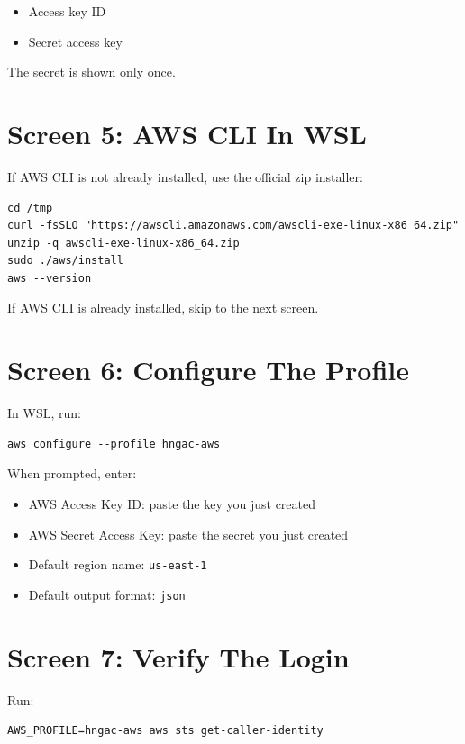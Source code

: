 \documentclass[11pt]{article}
\begin{document}
\begin{itemize}
\item Access key ID
\item Secret access key
\end{itemize}

The secret is shown only once.

\section*{Screen 5: AWS CLI In WSL}

If AWS CLI is not already installed, use the official zip installer:

\begin{verbatim}
cd /tmp
curl -fsSLO "https://awscli.amazonaws.com/awscli-exe-linux-x86_64.zip"
unzip -q awscli-exe-linux-x86_64.zip
sudo ./aws/install
aws --version
\end{verbatim}

If AWS CLI is already installed, skip to the next screen.

\section*{Screen 6: Configure The Profile}

In WSL, run:

\begin{verbatim}
aws configure --profile hngac-aws
\end{verbatim}

When prompted, enter:

\begin{itemize}
\item AWS Access Key ID: paste the key you just created
\item AWS Secret Access Key: paste the secret you just created
\item Default region name: \texttt{us-east-1}
\item Default output format: \texttt{json}
\end{itemize}

\section*{Screen 7: Verify The Login}

Run:

\begin{verbatim}
AWS_PROFILE=hngac-aws aws sts get-caller-identity
\end{verbatim}
\end{document}

